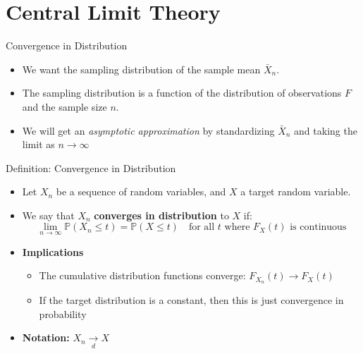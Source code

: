 \documentclass[handout, aspectratio=169]{beamer}
\numberwithin{equation}{section}
\begin{document}
\section{Central Limit Theory}

\begin{frame}{Convergence in Distribution}
\begin{itemize}
\item We want the sampling distribution of the sample mean $\bar{X}_n$.
\item The sampling distribution is a function of the distribution of observations $F$ and the sample size $n$.
\item We will get an \emph{asymptotic approximation} by standardizing $\bar{X}_n$ and taking the limit as $n\to \infty$
\end{itemize}
\end{frame}


\begin{frame}{Definition: Convergence in Distribution}
\begin{itemize}
  \item Let \( X_n \) be a sequence of random variables, and \( X \) a target random variable.
  \item We say that \( X_n \) \textbf{converges in distribution} to \( X \) if:
  \[
  \lim_{n \to \infty} \mathbb{P}(X_n \leq t) = \mathbb{P}(X \leq t) \quad \text{for all } t \text{ where } F_X(t) \text{ is continuous}
  \]

  \item \textbf{Implications}
  \begin{itemize}
    \item The cumulative distribution functions converge: \( F_{X_n}(t) \to F_X(t) \)
    \item If the target distribution is a constant, then this is just convergence in probability
  \end{itemize}
  \item \textbf{Notation:} \quad \( X_n \underset{d}{\to} X \)
\end{itemize}
\end{frame}

\end{document}
